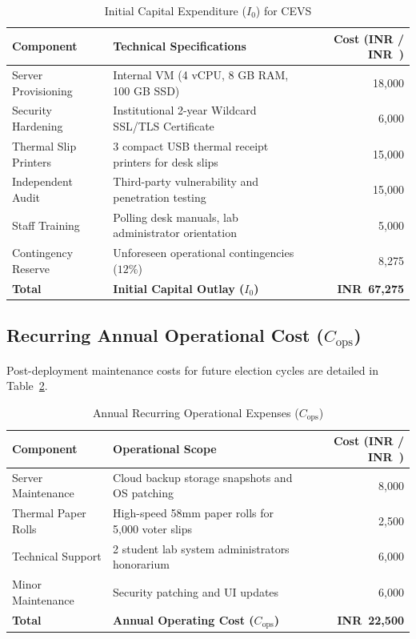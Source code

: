 \documentclass[12pt,a4paper,oneside]{report}
\begin{document}
\begin{table}[H]
    \centering
    \caption{Initial Capital Expenditure ($I_0$) for CEVS}
    \label{tab:capex_costs}
    \begin{tabular}{llr}
        \toprule
        \textbf{Component} & \textbf{Technical Specifications} & \textbf{Cost (INR / INR~)} \\
        \midrule
        Server Provisioning & Internal VM (4 vCPU, 8 GB RAM, 100 GB SSD) & 18,000 \\
        Security Hardening & Institutional 2-year Wildcard SSL/TLS Certificate & 6,000 \\
        Thermal Slip Printers & 3 compact USB thermal receipt printers for desk slips & 15,000 \\
        Independent Audit & Third-party vulnerability and penetration testing & 15,000 \\
        Staff Training & Polling desk manuals, lab administrator orientation & 5,000 \\
        Contingency Reserve & Unforeseen operational contingencies ($12\%$) & 8,275 \\
        \midrule
        \textbf{Total} & \textbf{Initial Capital Outlay ($I_0$)} & \textbf{INR~67,275} \\
        \bottomrule
    \end{tabular}
\end{table}

\subsection{Recurring Annual Operational Cost ($C_{\text{ops}}$)}
Post-deployment maintenance costs for future election cycles are detailed in Table~\ref{tab:recurring_costs}.

\begin{table}[H]
    \centering
    \caption{Annual Recurring Operational Expenses ($C_{\text{ops}}$)}
    \label{tab:recurring_costs}
    \begin{tabular}{llr}
        \toprule
        \textbf{Component} & \textbf{Operational Scope} & \textbf{Cost (INR / INR~)} \\
        \midrule
        Server Maintenance & Cloud backup storage snapshots and OS patching & 8,000 \\
        Thermal Paper Rolls & High-speed 58mm paper rolls for 5,000 voter slips & 2,500 \\
        Technical Support & 2 student lab system administrators honorarium & 6,000 \\
        Minor Maintenance & Security patching and UI updates & 6,000 \\
        \midrule
        \textbf{Total} & \textbf{Annual Operating Cost ($C_{\text{ops}}$)} & \textbf{INR~22,500} \\
        \bottomrule
    \end{tabular}
\end{table}
\end{document}
